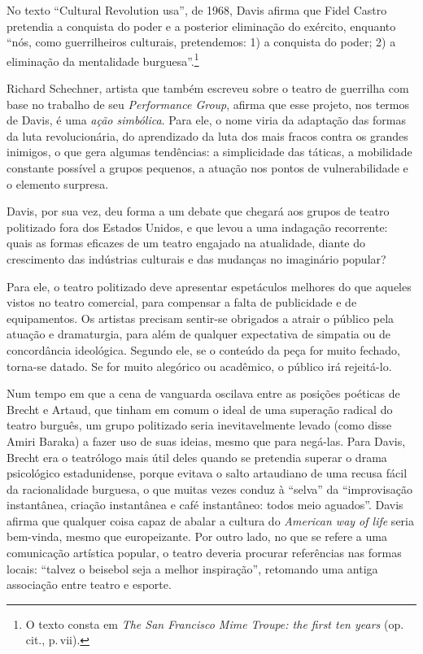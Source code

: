 {No texto “Cultural Revolution {\sc usa}”, de 1968, Davis afirma que
Fidel Castro pretendia a conquista do poder e a posterior eliminação do
exército, enquanto “nós, como guerrilheiros culturais, pretendemos: 1) a
conquista do poder; 2) a eliminação da mentalidade burguesa”.\footnote{O
  texto consta em {\it The San Francisco Mime Troupe: the
  first ten years} (op.\,cit., p.\,vii).}

Richard Schechner, artista que também escreveu sobre o teatro de
guerrilha com base no trabalho de seu {\it Performance Group},
afirma que esse projeto, nos termos de Davis, é uma {\it ação
simbólica}. Para ele, o nome viria da adaptação das formas da luta
revolucionária, do aprendizado da luta dos mais fracos contra os grandes
inimigos, o que gera algumas tendências: a simplicidade das táticas, a
mobilidade constante possível a grupos pequenos, a atuação nos pontos de
vulnerabilidade e o elemento surpresa.

Davis, por sua vez, deu forma a um debate que chegará aos grupos de
teatro politizado fora dos Estados Unidos, e que levou a uma indagação
recorrente: quais as formas eficazes de um teatro engajado na
atualidade, diante do crescimento das indústrias culturais e das
mudanças no imaginário popular?

Para ele, o teatro politizado deve
apresentar espetáculos melhores do que aqueles vistos no teatro
comercial, para compensar a falta de publicidade e de equipamentos. Os
artistas precisam sentir-se obrigados a atrair o público pela atuação e
dramaturgia, para além de qualquer expectativa de simpatia ou de
concordância ideológica. Segundo ele, se o conteúdo da peça for muito
fechado, torna-se datado. Se for muito alegórico ou acadêmico, o público
irá rejeitá-lo.

Num tempo em que a cena de vanguarda oscilava entre as posições poéticas
de Brecht e Artaud, que tinham em comum o ideal de uma superação radical
do teatro burguês, um grupo politizado seria inevitavelmente levado
(como disse Amiri Baraka) a fazer uso de suas ideias, mesmo que para
negá-las. Para Davis, Brecht era o teatrólogo mais útil deles quando se
pretendia superar o drama psicológico estadunidense, porque evitava o
salto artaudiano de uma recusa fácil da racionalidade burguesa, o que
muitas vezes conduz à “selva” da “improvisação instantânea, criação
instantânea e café instantâneo: todos meio aguados”. Davis afirma que
qualquer coisa capaz de abalar a cultura do {\it American way of life}
seria bem-vinda, mesmo que europeizante. Por outro lado, no que se refere
a uma comunicação artística popular, o teatro deveria procurar
referências nas formas locais: “talvez o beisebol seja a melhor
inspiração”, retomando uma antiga associação entre teatro e esporte.

}
